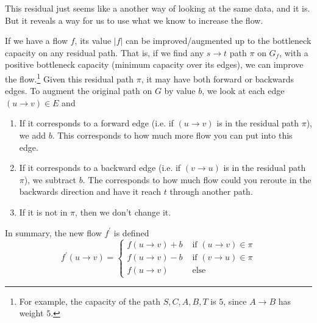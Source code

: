   This residual just seems like a another way of looking at the same data, and it is. But it reveals a way for us to use what we know to increase the flow.  

  \begin{theorem}
    If we have a flow $f$, its value $|f|$ can be improved/augmented up to the bottleneck capacity on any residual path. That is, if we find any $s \rightarrow t$ path $\pi$ on $G_f$, with a positive bottleneck capacity (minimum capacity over its edges), we can improve the flow.\footnote{For example, the capacity of the path $S, C, A, B, T$ is $5$, since $A \rightarrow B$ has weight $5$.} Given this residual path $\pi$, it may have both forward or backwards edges. To augment the original path on $G$ by value $b$, we look at each edge $(u \rightarrow v) \in E$ and 
    \begin{enumerate}
      \item If it corresponds to a forward edge (i.e. if $(u \rightarrow v)$ is in the residual path $\pi$), we add $b$. This corresponds to how much more flow you can put into this edge. 
      \item If it corresponds to a backward edge (i.e. if $(v \rightarrow u)$ is in the residual path $\pi$), we subtract $b$. The corresponds to how much flow could you reroute in the backwards direction and have it reach $t$ through another path.   
      \item If it is not in $\pi$, then we don't change it. 
    \end{enumerate}
    In summary, the new flow $f^\prime$ is defined 
    \begin{equation}
      f^\prime (u \rightarrow v) = \begin{cases} 
        f(u \rightarrow v) + b & \text{ if } (u \rightarrow v) \in \pi \\ 
        f(u \rightarrow v) - b & \text{ if } (v \rightarrow u) \in \pi \\  
        f(u \rightarrow v) & \text{ else }
      \end{cases}
    \end{equation}
  \end{theorem} 
